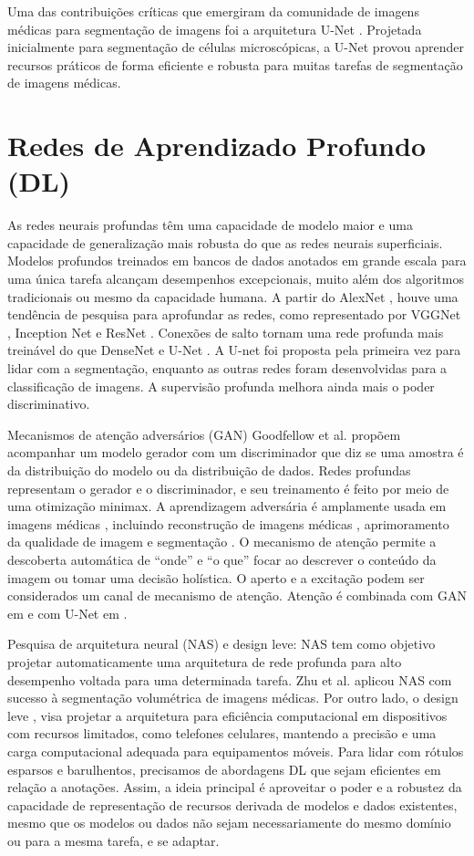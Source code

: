 \documentclass[
	12pt,				%
	openany,oneside,
	a4paper,			%
	english,			%
	brazil,				%
	]{abntex2}
\begin{document}
Uma das contribuições críticas que emergiram da comunidade de imagens médicas para segmentação de imagens foi a arquitetura U-Net \cite{c9}. Projetada inicialmente para segmentação de células microscópicas, a U-Net provou aprender recursos práticos de forma eficiente e robusta para muitas tarefas de segmentação de imagens médicas.

\section{Redes de Aprendizado Profundo (DL)}
As redes neurais profundas têm uma capacidade de modelo maior e uma capacidade de generalização mais robusta do que as redes neurais superficiais. Modelos profundos treinados em bancos de dados anotados em grande escala para uma única tarefa alcançam desempenhos excepcionais, muito além dos algoritmos tradicionais ou mesmo da capacidade humana. A partir do AlexNet \cite{c4}, houve uma tendência de pesquisa para aprofundar as redes, como representado por VGGNet \cite{c10}, Inception Net \cite{c11} e ResNet \cite{c12}. Conexões de salto tornam uma rede profunda mais treinável do que DenseNet \cite{c13} e U-Net \cite{c9}. A U-net foi proposta pela primeira vez para lidar com a segmentação, enquanto as outras redes foram desenvolvidas para a classificação de imagens. A supervisão profunda \cite{c14} melhora ainda mais o poder discriminativo.

Mecanismos de atenção adversários (GAN) Goodfellow et al. \cite{c15} propõem acompanhar um modelo gerador com um discriminador que diz se uma amostra é da distribuição do modelo ou da distribuição de dados. Redes profundas representam o gerador e o discriminador, e seu treinamento é feito por meio de uma otimização minimax. A aprendizagem adversária é amplamente usada em imagens médicas \cite{c16}, incluindo reconstrução de imagens médicas \cite{c17}, aprimoramento da qualidade de imagem \cite{c18} e segmentação \cite{c19}. O mecanismo de atenção \cite{c20} permite a descoberta automática de “onde” e “o que” focar ao descrever o conteúdo da imagem ou tomar uma decisão holística. O aperto e a excitação \cite{c21} podem ser considerados um canal de mecanismo de atenção. Atenção é combinada com GAN em \cite{c22} e com U-Net em \cite{c23}.

Pesquisa de arquitetura neural (NAS) e design leve: NAS \cite{c24} tem como objetivo projetar automaticamente uma arquitetura de rede profunda para alto desempenho voltada para uma determinada tarefa. Zhu et al. \cite{c25} aplicou NAS com sucesso à segmentação volumétrica de imagens médicas. Por outro lado, o design leve \cite{c26, c27}, visa projetar a arquitetura para eficiência computacional em dispositivos com recursos limitados, como telefones celulares, mantendo a precisão e uma carga computacional adequada para equipamentos móveis. Para lidar com rótulos esparsos e barulhentos, precisamos de abordagens DL que sejam eficientes em relação a anotações. Assim, a ideia principal é aproveitar o poder e a robustez da capacidade de representação de recursos derivada de modelos e dados existentes, mesmo que os modelos ou dados não sejam necessariamente do mesmo domínio ou para a mesma tarefa, e se adaptar.
\end{document}

